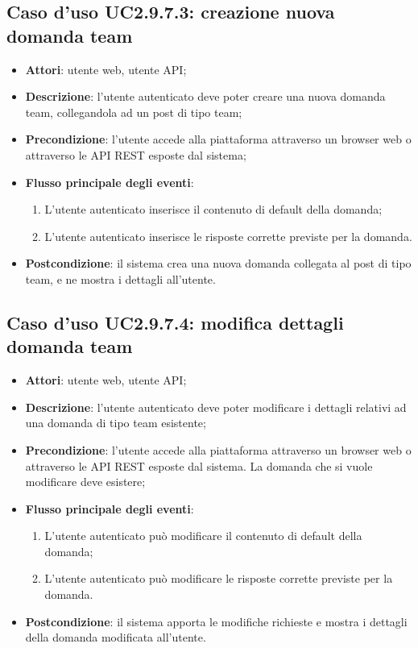 \subsection{Caso d'uso UC2.9.7.3: creazione nuova domanda team}
\begin{itemize}
\item \textbf{Attori}: utente web, utente API;
\item \textbf{Descrizione}: l'utente autenticato deve poter creare una nuova domanda team, collegandola ad un post di tipo team; 
      \item \textbf{Precondizione}: l'utente accede alla piattaforma attraverso un browser web o attraverso le API REST esposte dal sistema;

        \item \textbf{Flusso principale degli eventi}:
          \begin{enumerate}
          \item L'utente autenticato inserisce il contenuto di default della domanda;
          \item L'utente autenticato inserisce le risposte corrette previste per la domanda.

      \end{enumerate}
    \item \textbf{Postcondizione}: il sistema crea una nuova domanda collegata al post di tipo team, e ne mostra i dettagli all'utente.
  \end{itemize}
\hypertarget{UC2.9.7.4}{}
\subsection{Caso d'uso UC2.9.7.4: modifica dettagli domanda team}
\begin{itemize}
\item \textbf{Attori}: utente web, utente API;
\item \textbf{Descrizione}: l'utente autenticato deve poter modificare i dettagli relativi ad una domanda di tipo team esistente; 
      \item \textbf{Precondizione}: l'utente accede alla piattaforma attraverso un browser web o attraverso le API REST esposte dal sistema. La domanda che si vuole modificare deve esistere;

        \item \textbf{Flusso principale degli eventi}:
          \begin{enumerate}
          \item L'utente autenticato può modificare il contenuto di default della domanda;
          \item L'utente autenticato può modificare le risposte corrette previste per la domanda.

      \end{enumerate}
    \item \textbf{Postcondizione}: il sistema apporta le modifiche richieste e mostra i dettagli della domanda modificata all'utente.
  \end{itemize}
\hypertarget{UC2.9.7.5}{}
